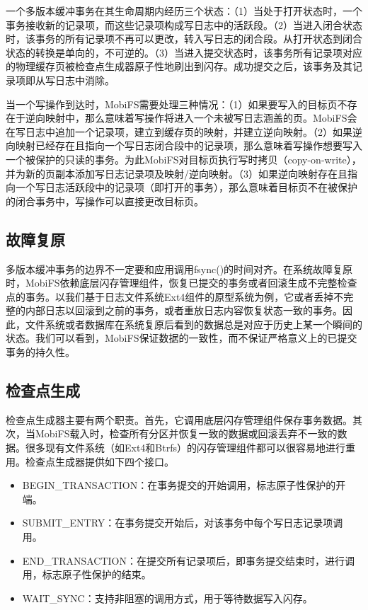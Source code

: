 一个多版本缓冲事务在其生命周期内经历三个状态：（1）当处于打开状态时，一个事务接收新的记录项，而这些记录项构成写日志中的活跃段。（2）当进入闭合状态时，该事务的所有记录项不再可以更改，转入写日志的闭合段。从打开状态到闭合状态的转换是单向的，不可逆的。（3）当进入提交状态时，该事务所有记录项对应的物理缓存页被检查点生成器原子性地刷出到闪存。成功提交之后，该事务及其记录项即从写日志中消除。 
 
当一个写操作到达时，MobiFS需要处理三种情况：（1）如果要写入的目标页不存在于逆向映射中，那么意味着写操作将进入一个未被写日志涵盖的页。MobiFS会在写日志中追加一个记录项，建立到缓存页的映射，并建立逆向映射。（2）如果逆向映射已经存在且指向一个写日志闭合段中的记录项，那么意味着写操作想要写入一个被保护的只读的事务。为此MobiFS对目标页执行写时拷贝（copy-on-write），并为新的页副本添加写日志记录项及映射/逆向映射。（3）如果逆向映射存在且指向一个写日志活跃段中的记录项（即打开的事务），那么意味着目标页不在被保护的闭合事务中，写操作可以直接更改目标页。

\subsection{故障复原}

多版本缓冲事务的边界不一定要和应用调用fsync()的时间对齐。在系统故障复原时，MobiFS依赖底层闪存管理组件，恢复已提交的事务或者回滚生成不完整检查点的事务。以我们基于日志文件系统Ext4组件的原型系统为例，它或者丢掉不完整的内部日志以回滚到之前的事务，或者重放日志内容恢复状态一致的事务。因此，文件系统或者数据库在系统复原后看到的数据总是对应于历史上某一个瞬间的状态。我们可以看到，MobiFS保证数据的一致性，而不保证严格意义上的已提交事务的持久性。

\subsection{检查点生成}

检查点生成器主要有两个职责。首先，它调用底层闪存管理组件保存事务数据。其次，当MobiFS载入时，检查所有分区并恢复一致的数据或回滚丢弃不一致的数据。很多现有文件系统（如Ext4和Btrfs）的闪存管理组件都可以很容易地进行重用。检查点生成器提供如下四个接口。 

\begin{itemize}
\item BEGIN\_TRANSACTION：在事务提交的开始调用，标志原子性保护的开端。 
\item SUBMIT\_ENTRY：在事务提交开始后，对该事务中每个写日志记录项调用。 
\item END\_TRANSACTION：在提交所有记录项后，即事务提交结束时，进行调用，标志原子性保护的结束。 
\item WAIT\_SYNC：支持非阻塞的调用方式，用于等待数据写入闪存。 
\end{itemize}

